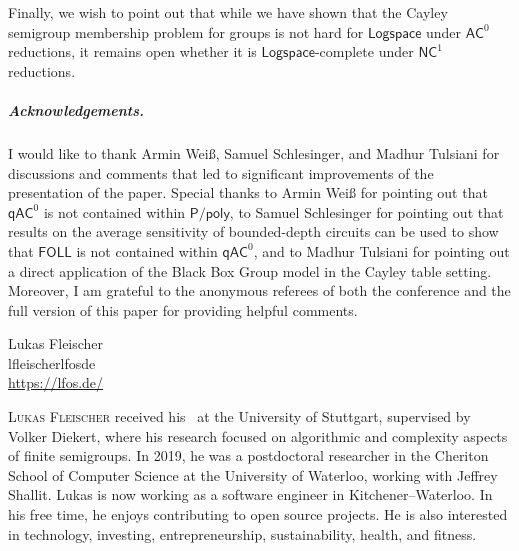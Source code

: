 \documentclass{toc}
\newcommand{\FOLL}{\ensuremath{\mathsf{FOLL}}}
\newcommand{\AC}{\ensuremath{\mathsf{AC}}}
\newcommand{\qAC}{\ensuremath{\mathsf{qAC}}}
\newcommand{\NC}{\ensuremath{\mathsf{NC}}}
\newcommand{\LOGSPACE}{\ensuremath{\mathsf{Logspace}}}
\newcommand{\Ppoly}{\ensuremath{\mathsf{P / poly}}}
\newcommand{\SCSM}{Cayley semigroup membership}
\newcommand{\SCSMP}{{\SCSM} problem}
\begin{document}
%
%
Finally, we wish to point out that while we have shown that
the {\SCSMP} for groups is not hard for $\LOGSPACE$ under
$\AC^0$ reductions, it remains open whether it is
$\LOGSPACE$-complete under $\NC^1$ reductions.  %

\subparagraph{Acknowledgements.} I would like to thank Armin Weiß, Samuel
Schlesinger, and Madhur Tulsiani for discussions and comments that led to
significant improvements of the presentation of the paper. Special thanks to
Armin Weiß for pointing out that $\qAC^0$ is not contained within $\Ppoly$, to
Samuel Schlesinger for pointing out that results on the average sensitivity of
bounded-depth circuits can be used to show that $\FOLL$ is not contained within
$\qAC^0$, and to Madhur Tulsiani for pointing out a direct application of the
Black Box Group model in the Cayley table setting.
%
Moreover, I am grateful to the anonymous referees of both the conference and
the full version of this paper for providing helpful comments.


%
%


\begin{tocauthors}             %
\begin{tocinfo}[fleischer]
 Lukas Fleischer \\
%
%
%
 lfleischer\tocat{}lfos\tocdot{}de \\
 \url{https://lfos.de/}
\end{tocinfo}
\end{tocauthors}

\begin{tocaboutauthors}  
\begin{tocabout}[fleischer]
  \textsc{Lukas Fleischer} received his \phd\ at the University of Stuttgart,
  supervised by Volker Diekert, where his research focused on algorithmic and
  complexity aspects of finite semigroups.
  In 2019, he was a postdoctoral researcher in the Cheriton School of Computer
  Science at the University of Waterloo, working with Jeffrey Shallit.
  Lukas is now working as a software engineer in Kitchener--Waterloo.
  In his free time, he enjoys contributing to open source projects. He is also
  interested in technology, investing, entrepreneurship, sustainability,
  health, and fitness.
\end{tocabout}
\end{tocaboutauthors}
\end{document}
